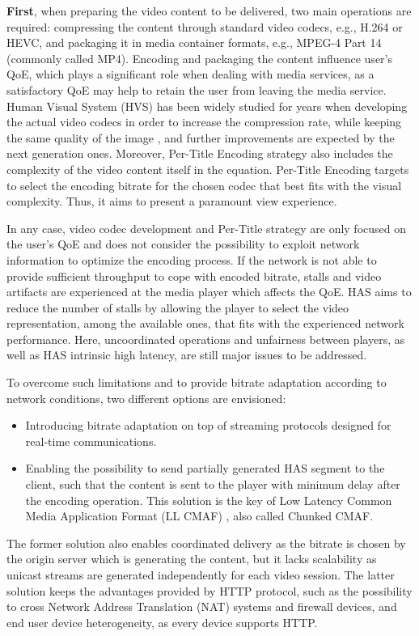 \textbf{First}, when preparing the video content to be delivered, two main operations are required: compressing the content through standard video codecs, e.g., H.264 or HEVC, and packaging it in media container formats, e.g., MPEG-4 Part 14 (commonly called MP4). Encoding and packaging the content influence user's QoE, which plays a significant role when dealing with media services, as a satisfactory QoE may help to retain the user from leaving the media service. Human Visual System (HVS) has been widely studied for years when developing the actual video codecs in order to increase the compression rate, while keeping the same quality of the image \cite{torres2012video}, and further improvements are expected by the next generation ones. Moreover, Per-Title Encoding \cite{PerTitle2015} strategy also includes the complexity of the video content itself in the equation. Per-Title Encoding targets to select the encoding bitrate for the chosen codec that best fits with the visual complexity. Thus, it aims to present a paramount view experience.

In any case, video codec development and Per-Title strategy are only focused on the user's QoE and does not consider the possibility to exploit network information to optimize the encoding process. If the network is not able to provide sufficient throughput to cope with encoded bitrate, stalls and video artifacts are experienced at the media player which affects the QoE. HAS aims to reduce the number of stalls by allowing the player to select the video representation, among the available ones, that fits with the experienced network performance. Here, uncoordinated operations and unfairness between players, as well as HAS intrinsic high latency, are still major issues to be addressed.

To overcome such limitations and to provide bitrate adaptation according to network conditions, two different options are envisioned:
\begin{itemize}
	\item Introducing bitrate adaptation on top of streaming protocols designed for real-time communications.
	\item Enabling the possibility to send partially generated HAS segment to the client, such that the content is sent to the player with minimum delay after the encoding operation. This solution is the key of Low Latency Common Media Application Format (LL CMAF) \cite{hughes2017information}, also called Chunked CMAF.
\end{itemize}
The former solution also enables coordinated delivery as the bitrate is chosen by the origin server which is generating the content, but it lacks scalability as unicast streams are generated independently for each video session. The latter solution keeps the advantages provided by HTTP protocol, such as the possibility to cross Network Address Translation (NAT) systems and firewall devices, and end user device heterogeneity, as every device supports HTTP.

